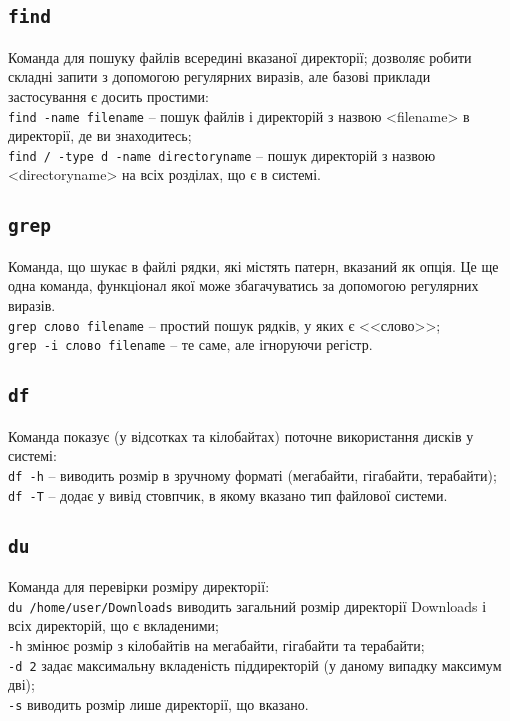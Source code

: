 \documentclass[10pt,a4paper]{fancyhandout}
\begin{document}
\subsection{\texttt{find}}
Команда для пошуку файлів всередині вказаної директорії; дозволяє робити складні запити з допомогою регулярних виразів, але базові приклади застосування є досить простими: \\
\texttt{find -name filename} -- пошук файлів і директорій з назвою <filename> в директорії, де ви знаходитесь; \\
\texttt{find / -type d -name directoryname} -- пошук директорій з назвою <directoryname> на всіх розділах, що є в системі.
\goodbreak

\subsection{\texttt{grep}}
Команда, що шукає в файлі рядки, які містять патерн, вказаний як опція. Це ще одна команда, функціонал якої може збагачуватись за допомогою регулярних виразів. \\
\texttt{grep слово filename} -- простий пошук рядків, у яких є <<слово>>; \\
\texttt{grep -i слово filename} -- те саме, але ігноруючи регістр.
\goodbreak

\subsection{\texttt{df}}
Команда показує (у відсотках та кілобайтах) поточне використання дисків у системі: \\
\texttt{df -h} -- виводить розмір в зручному форматі (мегабайти, гігабайти, терабайти); \\
\texttt{df -T} -- додає у вивід стовпчик, в якому вказано тип файлової системи.
\goodbreak

\subsection{\texttt{du}}
Команда для перевірки розміру директорії: \\
\texttt{du /home/user/Downloads} виводить загальний розмір директорії Downloads і всіх директорій, що є вкладеними; \\
\texttt{-h} змінює розмір з кілобайтів на мегабайти, гігабайти та терабайти; \\
\texttt{-d 2} задає максимальну вкладеність піддиректорій (у даному випадку максимум дві); \\
\texttt{-s} виводить розмір лише директорії, що вказано.
\goodbreak
\end{document}
